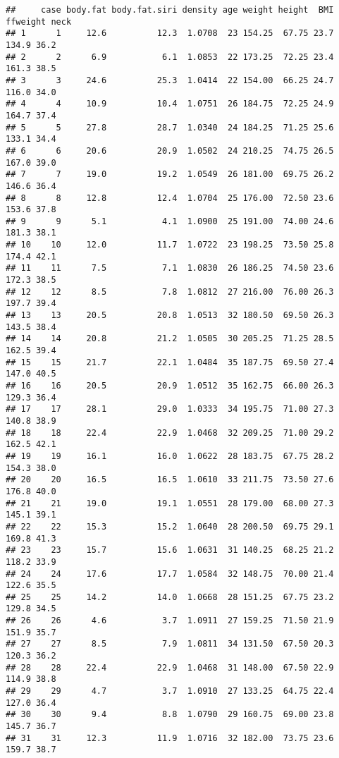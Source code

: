 \documentclass[
]{book}
\theoremstyle{definition}
\theoremstyle{definition}
\theoremstyle{definition}
\theoremstyle{definition}
\theoremstyle{remark}
\begin{document}
\begin{verbatim}
##     case body.fat body.fat.siri density age weight height  BMI ffweight neck
## 1      1     12.6          12.3  1.0708  23 154.25  67.75 23.7    134.9 36.2
## 2      2      6.9           6.1  1.0853  22 173.25  72.25 23.4    161.3 38.5
## 3      3     24.6          25.3  1.0414  22 154.00  66.25 24.7    116.0 34.0
## 4      4     10.9          10.4  1.0751  26 184.75  72.25 24.9    164.7 37.4
## 5      5     27.8          28.7  1.0340  24 184.25  71.25 25.6    133.1 34.4
## 6      6     20.6          20.9  1.0502  24 210.25  74.75 26.5    167.0 39.0
## 7      7     19.0          19.2  1.0549  26 181.00  69.75 26.2    146.6 36.4
## 8      8     12.8          12.4  1.0704  25 176.00  72.50 23.6    153.6 37.8
## 9      9      5.1           4.1  1.0900  25 191.00  74.00 24.6    181.3 38.1
## 10    10     12.0          11.7  1.0722  23 198.25  73.50 25.8    174.4 42.1
## 11    11      7.5           7.1  1.0830  26 186.25  74.50 23.6    172.3 38.5
## 12    12      8.5           7.8  1.0812  27 216.00  76.00 26.3    197.7 39.4
## 13    13     20.5          20.8  1.0513  32 180.50  69.50 26.3    143.5 38.4
## 14    14     20.8          21.2  1.0505  30 205.25  71.25 28.5    162.5 39.4
## 15    15     21.7          22.1  1.0484  35 187.75  69.50 27.4    147.0 40.5
## 16    16     20.5          20.9  1.0512  35 162.75  66.00 26.3    129.3 36.4
## 17    17     28.1          29.0  1.0333  34 195.75  71.00 27.3    140.8 38.9
## 18    18     22.4          22.9  1.0468  32 209.25  71.00 29.2    162.5 42.1
## 19    19     16.1          16.0  1.0622  28 183.75  67.75 28.2    154.3 38.0
## 20    20     16.5          16.5  1.0610  33 211.75  73.50 27.6    176.8 40.0
## 21    21     19.0          19.1  1.0551  28 179.00  68.00 27.3    145.1 39.1
## 22    22     15.3          15.2  1.0640  28 200.50  69.75 29.1    169.8 41.3
## 23    23     15.7          15.6  1.0631  31 140.25  68.25 21.2    118.2 33.9
## 24    24     17.6          17.7  1.0584  32 148.75  70.00 21.4    122.6 35.5
## 25    25     14.2          14.0  1.0668  28 151.25  67.75 23.2    129.8 34.5
## 26    26      4.6           3.7  1.0911  27 159.25  71.50 21.9    151.9 35.7
## 27    27      8.5           7.9  1.0811  34 131.50  67.50 20.3    120.3 36.2
## 28    28     22.4          22.9  1.0468  31 148.00  67.50 22.9    114.9 38.8
## 29    29      4.7           3.7  1.0910  27 133.25  64.75 22.4    127.0 36.4
## 30    30      9.4           8.8  1.0790  29 160.75  69.00 23.8    145.7 36.7
## 31    31     12.3          11.9  1.0716  32 182.00  73.75 23.6    159.7 38.7

\end{verbatim}
\end{document}
